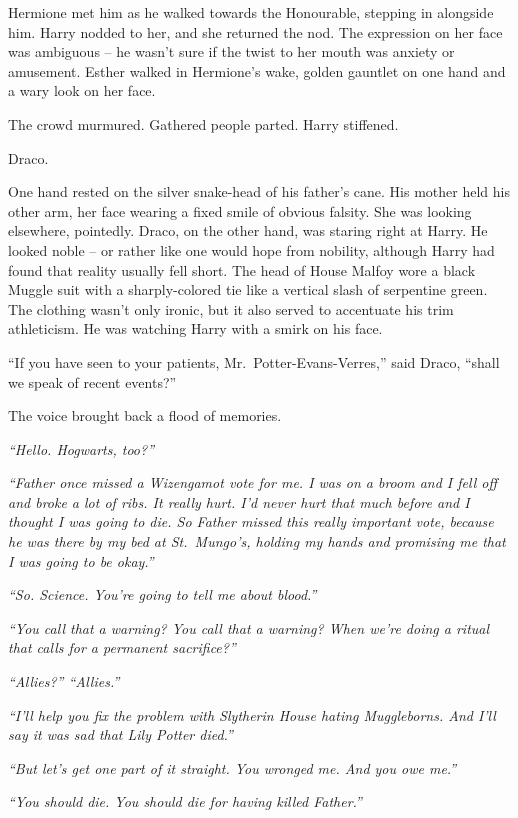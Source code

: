 Hermione met him as he walked towards the Honourable, stepping in
alongside him. Harry nodded to her, and she returned the nod. The
expression on her face was ambiguous -- he wasn't sure if the twist to
her mouth was anxiety or amusement. Esther walked in Hermione's wake,
golden gauntlet on one hand and a wary look on her face.

The crowd murmured. Gathered people parted. Harry stiffened.

Draco.

One hand rested on the silver snake-head of his father's cane. His
mother held his other arm, her face wearing a fixed smile of obvious
falsity. She was looking elsewhere, pointedly. Draco, on the other hand,
was staring right at Harry. He looked noble -- or rather like one would
hope from nobility, although Harry had found that reality usually fell
short. The head of House Malfoy wore a black Muggle suit with a
sharply-colored tie like a vertical slash of serpentine green. The
clothing wasn't only ironic, but it also served to accentuate his trim
athleticism. He was watching Harry with a smirk on his face.

``If you have seen to your patients, Mr.~Potter-Evans-Verres,'' said
Draco, ``shall we speak of recent events?''

The voice brought back a flood of memories.

\emph{``Hello. Hogwarts, too?''}

\emph{``Father once missed a Wizengamot vote for me. I was on a broom
and I fell off and broke a lot of ribs. It really hurt. I'd never hurt
that much before and I thought I was going to die. So Father missed this
really important vote, because he was there by my bed at St.~Mungo's,
holding my hands and promising me that I was going to be okay.''}

\emph{``So. Science. You're going to tell me about blood.''}

\emph{``You call that a warning? You call that a warning? When we're
doing a ritual that calls for a permanent sacrifice?''}

\emph{``Allies?'' ``Allies.''}

\emph{``I'll help you fix the problem with Slytherin House hating
Muggleborns. And I'll say it was sad that Lily Potter died.''}

\emph{``But let's get one part of it straight. You wronged me. And you
owe me.''}

\emph{``You should die. You should die for having killed Father.''}

